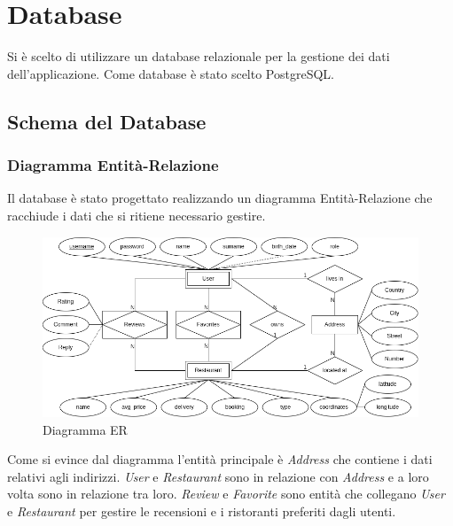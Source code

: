 \section{Database}
Si è scelto di utilizzare un database relazionale per 
la gestione dei dati dell'applicazione.
Come database è stato scelto PostgreSQL.

\subsection{Schema del Database}
\subsubsection{Diagramma Entità-Relazione}
Il database è stato progettato realizzando un 
diagramma Entità-Relazione che racchiude i dati che si ritiene 
necessario gestire.
\begin{figure}[H]
  \centering
  \includegraphics[width=\textwidth]{images/ER-base.png}
  \caption{Diagramma ER}
  \label{fig:er-diagram}
\end{figure}
Come si evince dal diagramma l'entità principale 
è \textit{Address} che contiene i dati relativi agli indirizzi. 
\textit{User} e \textit{Restaurant} sono in relazione con \textit{Address} 
e a loro volta sono in relazione tra loro.
\textit{Review} e \textit{Favorite} sono entità che collegano 
\textit{User} e \textit{Restaurant} per gestire le recensioni
e i ristoranti preferiti dagli utenti.
